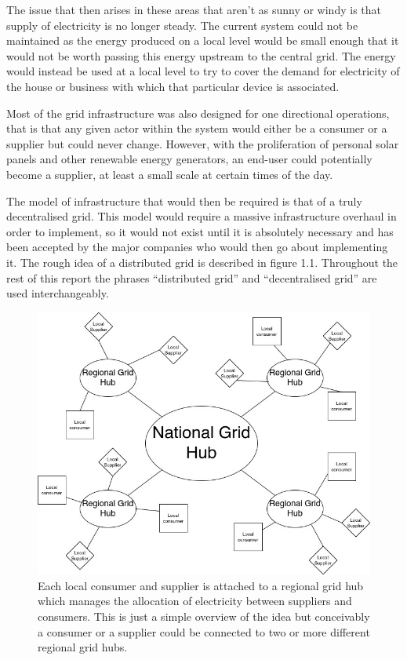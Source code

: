 \documentclass[a4paper, notitlepage]{report}
\begin{document}
The issue that then arises in these areas that aren’t as sunny or windy is that
supply of electricity is no longer steady. The current system could not be
maintained as the energy produced on a local level would be small enough that it
would not be worth passing this energy upstream to the central grid. The energy
would instead be used at a local level to try to cover the demand for
electricity of the house or business with which that particular device is
associated.

Most of the grid infrastructure was also designed for one directional
operations, that is that any given actor within the system would either be a
consumer or a supplier but could never change. However, with the proliferation
of personal solar panels and other renewable energy generators, an end-user
could potentially become a supplier, at least a small scale at certain times of
the day.

The model of infrastructure that would then be required is that of a truly
decentralised grid. This model would require a massive infrastructure overhaul
in order to implement, so it would not exist until it is absolutely necessary
and has been accepted by the major companies who would then go about
implementing it. The rough idea of a distributed grid is described in figure
1.1. Throughout the rest of this report the phrases “distributed grid” and
“decentralised grid” are used interchangeably.

\begin{figure}[htbp]
\centering
\includegraphics[width=.9\linewidth]{./img/DecentralisedGrid.jpg}
\caption{\label{fig:orgb078f0e}
Each local consumer and supplier is attached to a regional grid hub which manages the allocation of electricity between suppliers and consumers. This is just a simple overview of the idea but conceivably a consumer or a supplier could be connected to two or more different regional grid hubs.}
\end{figure}
\end{document}
